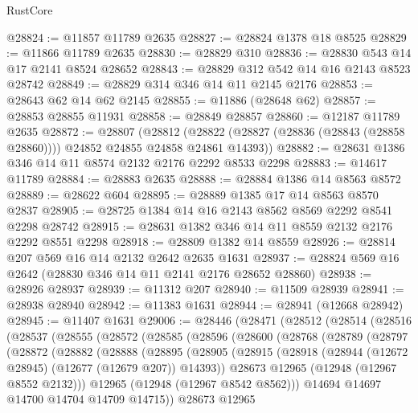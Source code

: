 \begin{lexlean}{RustCore}
\begin{coremodule}
@28824 := @11857 @11789 @2635
@28827 := @28824 @1378 @18 @8525
@28829 := @11866 @11789 @2635
@28830 := @28829 @310
@28836 := @28830 @543 @14 @17 @2141 @8524 @28652
@28843 := @28829 @312 @542 @14 @16 @2143 @8523 @28742
@28849 := @28829 @314 @346 @14 @11 @2145 @2176
@28853 := @28643 @62 @14 @62 @2145
@28855 := @11886 (@28648 @62)
@28857 := @28853 @28855 @11931
@28858 := @28849 @28857
@28860 := @12187 @11789 @2635
@28872 := @28807
    (@28812 (@28822 (@28827 (@28836 (@28843 (@28858 @28860)))) @24852 @24855 @24858 @24861 @14393))
@28882 := @28631 @1386 @346 @14 @11 @8574 @2132 @2176 @2292 @8533 @2298
@28883 := @14617 @11789
@28884 := @28883 @2635
@28888 := @28884 @1386 @14 @8563 @8572
@28889 := @28622 @604
@28895 := @28889 @1385 @17 @14 @8563 @8570 @2837
@28905 := @28725 @1384 @14 @16 @2143 @8562 @8569 @2292 @8541 @2298 @28742
@28915 := @28631 @1382 @346 @14 @11 @8559 @2132 @2176 @2292 @8551 @2298
@28918 := @28809 @1382 @14 @8559
@28926 := @28814 @207 @569 @16 @14 @2132 @2642 @2635 @1631
@28937 := @28824 @569 @16 @2642 (@28830 @346 @14 @11 @2141 @2176 @28652 @28860)
@28938 := @28926 @28937
@28939 := @11312 @207
@28940 := @11509 @28939
@28941 := @28938 @28940
@28942 := @11383 @1631
@28944 := @28941 (@12668 @28942)
@28945 := @11407 @1631
@29006 := @28446
    (@28471
      (@28512
        (@28514
          (@28516
            (@28537
              (@28555
                (@28572
                  (@28585
                    (@28596
                      (@28600
                        (@28768
                          (@28789
                            (@28797
                              (@28872
                                (@28882
                                  (@28888
                                    (@28895
                                      (@28905
                                        (@28915
                                          (@28918
                                            (@28944 (@12672 @28945) (@12677 (@12679 @207)) @14393))
                                          @28673
                                          @12965
                                          (@12948 (@12967 @8552 @2132)))
                                        @12965
                                        (@12948 (@12967 @8542 @8562)))
                                      @14694
                                      @14697
                                      @14700
                                      @14704
                                      @14709
                                      @14715))
                                  @28673
                                  @12965

\end{coremodule}
\end{lexlean}
